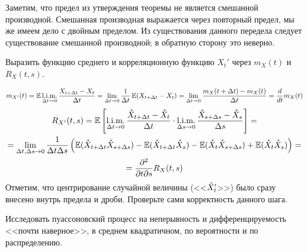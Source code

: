 Заметим, что предел из утверждения теоремы не является смешанной производной.
Смешанная производная выражается через повторный предел,
мы же имеем дело с двойным пределом.
Из существования данного передела следует существование смешанной производной;
в обратную сторону это неверно.

\begin{exercise}
    \label{exercise:moments_functions_of_derivative}
    Выразить функцию среднего и корреляционную функцию $ X_t' $ через $ m_X(t) $ и $ R_X(t, s) $.
\end{exercise}

\begin{solution}
    \[
        m_{X'}(t) = \operatorname{\mathbb{E}} \operatorname*{\textnormal{l.i.m.}}_{\Delta t \to 0} \frac{X_{t + \Delta t} - X_t}{\Delta t} = \lim_{\Delta t \to 0} \frac{1}{\Delta t} \operatorname{\mathbb{E}} (X_{t + \Delta t} - X_t) =
        \lim_{\Delta t \to 0} \frac{m_X(t + \Delta t) - m_X(t)}{\Delta t} = \frac{d}{d t} m_X(t)
    \]
    \begin{multline*}
        R_{X'}(t, s) = \operatorname{\mathbb{E}} \left[ \operatorname*{\textnormal{l.i.m.}}_{\Delta t \to 0} \frac{\mathring{X}_{t + \Delta t} - \mathring{X}_t}{\Delta t} \cdot
        \operatorname*{\textnormal{l.i.m.}}_{\Delta s \to 0} \frac{\mathring{X}_{s + \Delta s} - \mathring{X}_s}{\Delta s} \right] = \\
        = \lim_{\Delta t, \Delta s \to 0} \frac{1}{\Delta t \Delta s} \left( \operatorname{\mathbb{E}} (\mathring{X}_{t + \Delta t} \mathring{X}_{s + \Delta s}) -
        \operatorname{\mathbb{E}} (\mathring{X}_{t + \Delta t} \mathring{X}_s) - \operatorname{\mathbb{E}} (\mathring{X}_t \mathring{X}_{s + \Delta s}) + \operatorname{\mathbb{E}} (\mathring{X}_t \mathring{X}_s) \right) = \\
        = \frac{\partial^2}{\partial t \partial s} R_X(t, s)
    \end{multline*}
    Отметим, что центрирование случайной величины (<<$ \mathring{X}_t' $>>) было сразу внесено внутрь предела и дроби.
    Проверьте сами корректность данного шага.
\end{solution}


\begin{exercise}
    \label{exercise:calculus:Poisson_process_continuity_and_differentiability}
    Исследовать пуассоновский процесс на неперывность и дифференцируемость <<почти наверное>>, в среднем квадратичном, по вероятности и по распределению.
\end{exercise}

